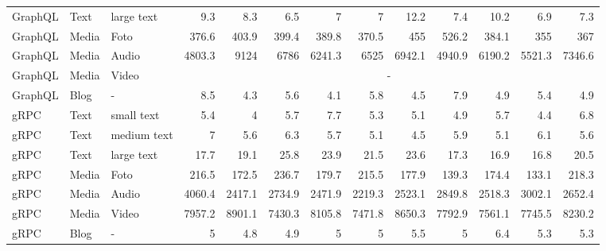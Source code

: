 \begin{table}[p]
{\begin{tabular}{|l|l|l|*{10}{r}|}
			GraphQL & Text & large text  & 9.3 & 8.3 & 6.5 & 7 & 7 & 12.2 & 7.4 & 10.2 & 6.9 & 7.3 \\
			GraphQL & Media & Foto       & 376.6 & 403.9 & 399.4 & 389.8 & 370.5 & 455 & 526.2 & 384.1 & 355 & 367 \\
			GraphQL & Media & Audio      & 4803.3 & 9124 & 6786 & 6241.3 & 6525 & 6942.1 & 4940.9 & 6190.2 & 5521.3 & 7346.6 \\
			GraphQL & Media & Video      & \multicolumn{10}{c|}{-} \\
			GraphQL & Blog  & -          & 8.5 & 4.3 & 5.6 & 4.1 & 5.8 & 4.5 & 7.9 & 4.9 & 5.4 & 4.9 \\
			\hline
			gRPC & Text & small text     & 5.4 & 4 & 5.7 & 7.7 & 5.3 & 5.1 & 4.9 & 5.7 & 4.4 & 6.8 \\
			gRPC & Text & medium text    & 7 & 5.6 & 6.3 & 5.7 & 5.1 & 4.5 & 5.9 & 5.1 & 6.1 & 5.6 \\
			gRPC & Text & large text     & 17.7 & 19.1 & 25.8 & 23.9 & 21.5 & 23.6 & 17.3 & 16.9 & 16.8 & 20.5 \\
			gRPC & Media & Foto          & 216.5 & 172.5 & 236.7 & 179.7 & 215.5 & 177.9 & 139.3 & 174.4 & 133.1 & 218.3 \\
			gRPC & Media & Audio         & 4060.4 & 2417.1 & 2734.9 & 2471.9 & 2219.3 & 2523.1 & 2849.8 & 2518.3 & 3002.1 & 2652.4 \\
			gRPC & Media & Video         & 7957.2 & 8901.1 & 7430.3 & 8105.8 & 7471.8 & 8650.3 & 7792.9 & 7561.1 & 7745.5 & 8230.2 \\
			gRPC & Blog  & -             & 5 & 4.8 & 4.9 & 5 & 5 & 5.5 & 5 & 6.4 & 5.3 & 5.3 \\
			\hline
	\end{tabular}}
\end{table}

	

